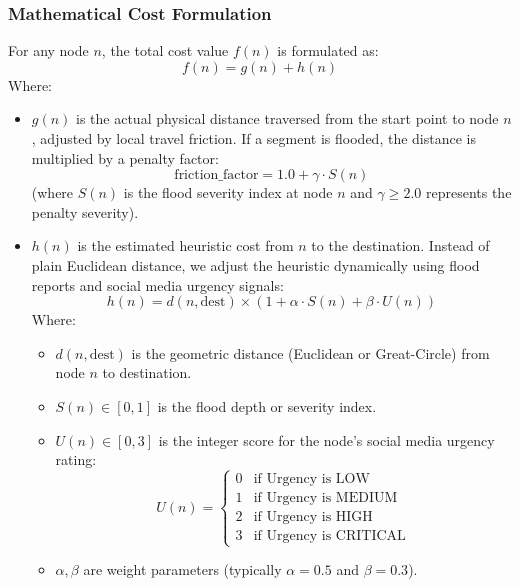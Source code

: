 \documentclass[12pt,a4paper]{article}
\begin{document}
\subsubsection{Mathematical Cost Formulation}
For any node $n$, the total cost value $f(n)$ is formulated as:
\begin{equation}
f(n) = g(n) + h(n)
\end{equation}
Where:
\begin{itemize}
    \item $g(n)$ is the actual physical distance traversed from the start point to node $n$, adjusted by local travel friction. If a segment is flooded, the distance is multiplied by a penalty factor:
    \begin{equation}
    \text{friction\_factor} = 1.0 + \gamma \cdot S(n)
    \end{equation}
    (where $S(n)$ is the flood severity index at node $n$ and $\gamma \ge 2.0$ represents the penalty severity).
    \item $h(n)$ is the estimated heuristic cost from $n$ to the destination. Instead of plain Euclidean distance, we adjust the heuristic dynamically using flood reports and social media urgency signals:
    \begin{equation}
    h(n) = d(n, \text{dest}) \times \left(1 + \alpha \cdot S(n) + \beta \cdot U(n)\right)
    \end{equation}
    Where:
    \begin{itemize}
        \item $d(n, \text{dest})$ is the geometric distance (Euclidean or Great-Circle) from node $n$ to destination.
        \item $S(n) \in [0, 1]$ is the flood depth or severity index.
        \item $U(n) \in [0, 3]$ is the integer score for the node's social media urgency rating:
        \begin{equation}
        U(n) = \begin{cases} 
        0 & \text{if Urgency is LOW} \\
        1 & \text{if Urgency is MEDIUM} \\
        2 & \text{if Urgency is HIGH} \\
        3 & \text{if Urgency is CRITICAL} 
        \end{cases}
        \end{equation}
        \item $\alpha, \beta$ are weight parameters (typically $\alpha = 0.5$ and $\beta = 0.3$).
    \end{itemize}
\end{itemize}
\end{document}
